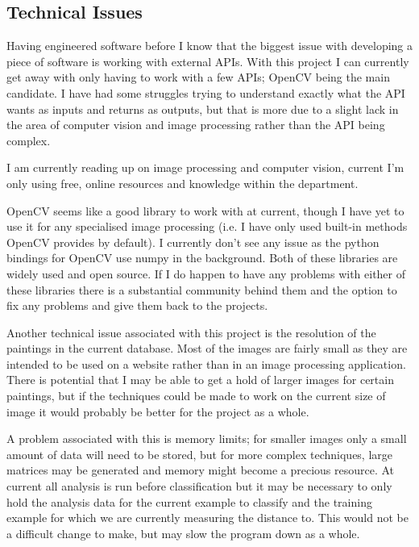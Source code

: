 \documentclass[11pt,fleqn,twoside]{article}
\begin{document}
\subsection{Technical Issues}
Having engineered software before I know that the biggest issue with developing a piece of software
is working with external APIs. With this project I can currently get away with only having to work
with a few APIs; OpenCV being the main candidate. I have had some struggles trying to understand
exactly what the API wants as inputs and returns as outputs, but that is more due to a slight lack
in the area of computer vision and image processing rather than the API being complex.

I am currently reading up on image processing and computer vision, current I'm only using free,
online resources\cite{Prince2012Computer} and knowledge within the department.

OpenCV seems like a good library to work with at current, though I have yet to use it for any
specialised image processing (i.e. I have only used built-in methods OpenCV provides by default).
I currently don't see any issue as the python bindings for OpenCV use numpy in the background. Both
of these libraries are widely used and open source. If I do happen to have any problems with either
of these libraries there is a substantial community behind them and the option to fix any problems
and give them back to the projects.

Another technical issue associated with this project is the resolution of the paintings in the 
current database. Most of the images are fairly small as they are intended to be used on a website
rather than in an image processing application. There is potential that I may be able to get a hold
of larger images for certain paintings, but if the techniques could be made to work on the current
size of image it would probably be better for the project as a whole.

A problem associated with this is memory limits; for smaller images only a small amount of data
will need to be stored, but for more complex techniques, large matrices may be generated and memory
might become a precious resource. At current all analysis is run before classification but it may
be necessary to only hold the analysis data for the current example to classify and the training 
example for which we are currently measuring the distance to. This would not be a difficult change
to make, but may slow the program down as a whole.

\end{document}
